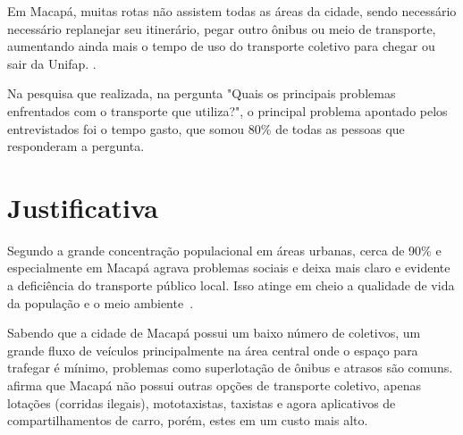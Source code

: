 Em Macapá, muitas rotas não assistem todas as áreas da cidade, sendo necessário necessário replanejar seu itinerário, pegar outro ônibus ou meio de transporte, aumentando ainda mais o tempo de uso do transporte coletivo para chegar ou sair da Unifap. \cite{galiano}.

Na pesquisa que realizada, na pergunta "Quais os principais problemas enfrentados com o transporte que utiliza?", o principal problema apontado pelos entrevistados foi o tempo gasto, que somou 80\% de todas as pessoas que responderam a pergunta.




\begin{comment}
Adicionar contexto da unifap e Macapá - incluir a quantidade de pesosas que pegam onibus diariamente e a quantidade de alunos que pegam na unifap
\end{comment}



\section{Justificativa}

 Segundo  a grande concentração populacional em áreas urbanas, cerca de 90\% e especialmente em Macapá agrava problemas sociais e deixa mais claro e evidente a deficiência do transporte público local. Isso atinge em cheio a qualidade de vida da população e o meio ambiente~\cite{sau2018}.

Sabendo que a cidade de Macapá possui um baixo número de coletivos, um grande fluxo de veículos principalmente na área central onde o espaço para trafegar é mínimo, problemas como superlotação de ônibus e atrasos são comuns.  afirma que Macapá não possui outras opções de transporte coletivo, apenas lotações (corridas ilegais), mototaxistas, taxistas e agora aplicativos de compartilhamentos de carro, porém, estes em um custo mais alto.


